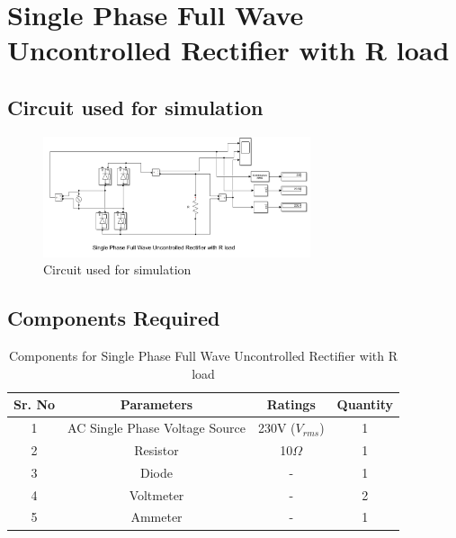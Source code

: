 \section{Single Phase Full Wave Uncontrolled Rectifier
  with R load}

\subsection{Circuit used for simulation}

\begin{figure}[h]
    \centering
    \includegraphics[width=0.7\textwidth]{images/experiment-2/circuit-diagram-simulation-01.png}
    \caption{Circuit used for simulation}
    \label{Fig_simulation_circuit_single-phase-full-wave-uncontrolled-rectifier-with-R-load}
\end{figure}

\subsection{Components Required}

\begin{table}[h]
    \renewcommand{\arraystretch}{1.3}
    \label{table_components_required_circuit_1}
    \centering
    \begin{tabular}{|c|c|c|c|}
        \hline
        Sr. No & Parameters                     & Ratings            & Quantity \\
        \hline
        \hline
        1      & AC Single Phase Voltage Source & 230V ($ V_{rms} $) & 1        \\
        \hline
        2      & Resistor                       & 10$ \Omega $       & 1        \\
        \hline
        3      & Diode                          & -                  & 1        \\
        \hline
        4      & Voltmeter                      & -                  & 2        \\
        \hline
        5      & Ammeter                        & -                  & 1        \\
        \hline
    \end{tabular}
    \caption{Components for Single Phase Full Wave Uncontrolled Rectifier with R load}

\end{table}




